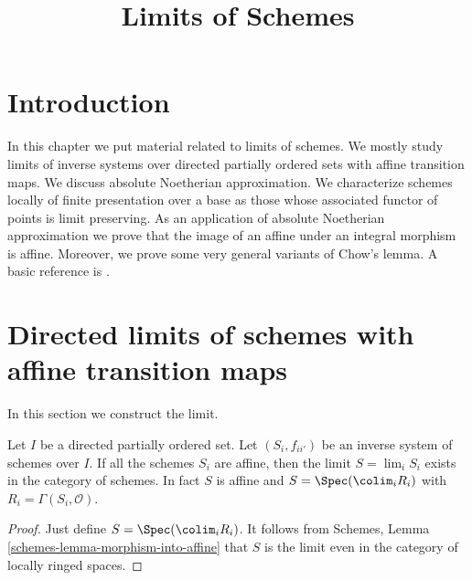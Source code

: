 

%


\title{Limits of Schemes}


\maketitle

\label{section-phantom}

\tableofcontents

\section{Introduction}
\label{section-introduction}

\noindent
In this chapter we put material related to limits of schemes. We mostly
study limits of inverse systems over directed partially ordered sets
with affine transition maps. We discuss absolute Noetherian
approximation. We characterize schemes locally of finite presentation
over a base as those whose associated functor of points is limit
preserving. As an application of absolute Noetherian approximation
we prove that the image of an affine under an integral morphism is affine.
Moreover, we prove some very general variants of Chow's lemma.
A basic reference is \cite{EGA}.




\section{Directed limits of schemes with affine transition maps}
\label{section-limits}

\noindent
In this section we construct the limit.

\begin{lemma}
\label{lemma-directed-inverse-system-affine-schemes-has-limit}
Let $I$ be a directed partially ordered set.
Let $(S_i, f_{ii'})$ be an inverse system of
schemes over $I$.  If all the schemes $S_i$
are affine, then the limit $S = \lim_i S_i$ exists
in the category of schemes.
In fact $S$ is affine and $S = \Spec(\colim_i R_i)$
with $R_i = \Gamma(S_i, \mathcal{O})$.
\end{lemma}

\begin{proof}
Just define $S = \Spec(\colim_i R_i)$.
It follows from Schemes, Lemma \ref{schemes-lemma-morphism-into-affine}
that $S$ is the limit even in the category of locally ringed spaces.
\end{proof}

